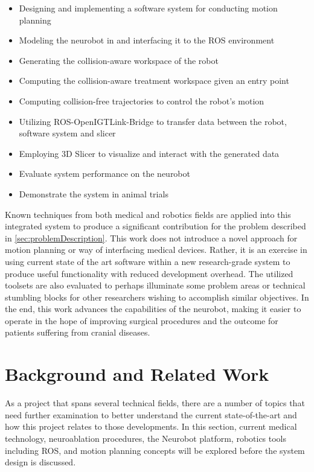 \documentclass[12pt]{report}
\begin{document}
\begin{itemize}
\singlespacing
\item Designing and implementing a software system for conducting motion planning
\item Modeling the neurobot in and interfacing it to the ROS environment
\item Generating the collision-aware workspace of the robot
\item Computing the collision-aware treatment workspace given an entry point
\item Computing collision-free trajectories to control the robot's motion
\item Utilizing ROS-OpenIGTLink-Bridge to transfer data between the robot, software system and slicer
\item Employing 3D Slicer to visualize and interact with the generated data
\item Evaluate system performance on the neurobot
\item Demonstrate the system in animal trials
\end{itemize}

Known techniques from both medical and robotics fields are applied into this integrated system to produce a significant contribution for the problem described in \autoref{sec:problemDescription}. This work does not introduce a novel approach for motion planning or way of interfacing medical devices. Rather, it is an exercise in using current state of the art software within a new research-grade system to produce useful functionality with reduced development overhead. The utilized toolsets are also evaluated to perhaps illuminate some problem areas or technical stumbling blocks for other researchers wishing to accomplish similar objectives. In the end, this work advances the capabilities of the neurobot, making it easier to operate in the hope of improving surgical procedures and the outcome for patients suffering from cranial diseases.


\chapter{Background and Related Work}
As a project that spans several technical fields, there are a number of topics that need further examination to better understand the current state-of-the-art and how this project relates to those developments. In this section, current medical technology, neuroablation procedures, the Neurobot platform, robotics tools including ROS, and motion planning concepts will be explored before the system design is discussed.
\end{document}
